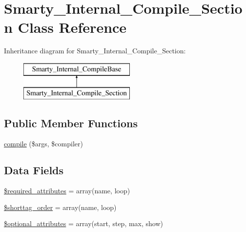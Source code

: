 \hypertarget{class_smarty___internal___compile___section}{}\section{Smarty\+\_\+\+Internal\+\_\+\+Compile\+\_\+\+Section Class Reference}
\label{class_smarty___internal___compile___section}
Inheritance diagram for Smarty\+\_\+\+Internal\+\_\+\+Compile\+\_\+\+Section\+:\begin{figure}[H]
\begin{center}
\leavevmode
\includegraphics[height=2.000000cm]{class_smarty___internal___compile___section}
\end{center}
\end{figure}
\subsection*{Public Member Functions}
\begin{DoxyCompactItemize}
\item 
\hyperlink{class_smarty___internal___compile___section_ad72fac0effa74aadee9b5ef6aed5f69f}{compile} (\$args, \$compiler)
\end{DoxyCompactItemize}
\subsection*{Data Fields}
\begin{DoxyCompactItemize}
\item 
\hyperlink{class_smarty___internal___compile___section_ae799507d5461de485f3a618abeecea95}{\$required\+\_\+attributes} = array(\textquotesingle{}name\textquotesingle{}, \textquotesingle{}loop\textquotesingle{})
\item 
\hyperlink{class_smarty___internal___compile___section_a2ccb25269c3a92e8c4796c7ef23725e6}{\$shorttag\+\_\+order} = array(\textquotesingle{}name\textquotesingle{}, \textquotesingle{}loop\textquotesingle{})
\item 
\hyperlink{class_smarty___internal___compile___section_a899d1eb4a6fecbd6ce696adb171c80a4}{\$optional\+\_\+attributes} = array(\textquotesingle{}start\textquotesingle{}, \textquotesingle{}step\textquotesingle{}, \textquotesingle{}max\textquotesingle{}, \textquotesingle{}show\textquotesingle{})
\end{DoxyCompactItemize}


